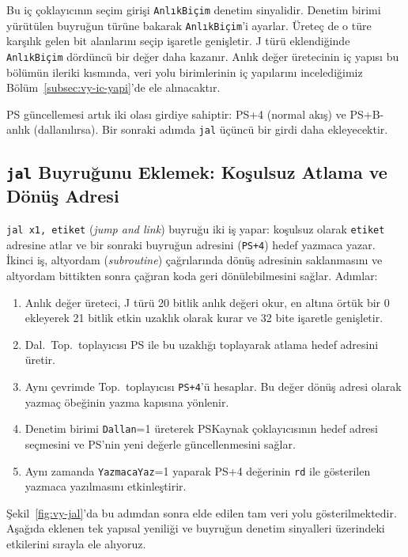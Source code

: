 Bu iç çoklayıcının seçim girişi \texttt{AnlıkBiçim} denetim sinyalidir. Denetim birimi yürütülen buyruğun türüne bakarak \texttt{AnlıkBiçim}'i ayarlar. Üreteç de o türe karşılık gelen bit alanlarını seçip işaretle genişletir. J türü eklendiğinde \texttt{AnlıkBiçim} dördüncü bir değer daha kazanır. Anlık değer üretecinin iç yapısı bu bölümün ileriki kısmında, veri yolu birimlerinin iç yapılarını incelediğimiz Bölüm~\ref{subsec:vy-ic-yapi}'de ele alınacaktır.

PS güncellemesi artık iki olası girdiye sahiptir: PS+4 (normal akış) ve PS+B-anlık (dallanılırsa). Bir sonraki adımda \texttt{jal} üçüncü bir girdi daha ekleyecektir.

\subsection{\texttt{jal} Buyruğunu Eklemek: Koşulsuz Atlama ve Dönüş Adresi}
\label{subsec:vy-jal}

\texttt{jal x1, etiket} (\emph{jump and link}) buyruğu iki iş yapar: koşulsuz olarak \texttt{etiket} adresine atlar ve bir sonraki buyruğun adresini (\texttt{PS+4}) hedef yazmaca yazar. İkinci iş, altyordam (\emph{subroutine}) çağrılarında dönüş adresinin saklanmasını ve altyordam bittikten sonra çağıran koda geri dönülebilmesini sağlar. Adımlar:
\begin{enumerate}
    \item Anlık değer üreteci, J türü 20 bitlik anlık değeri okur, en altına örtük bir 0 ekleyerek 21 bitlik etkin uzaklık olarak kurar ve 32 bite işaretle genişletir.
    \item Dal.\ Top.\ toplayıcısı PS ile bu uzaklığı toplayarak atlama hedef adresini üretir.
    \item Aynı çevrimde Top.\ toplayıcısı \texttt{PS+4}'ü hesaplar. Bu değer dönüş adresi olarak yazmaç öbeğinin yazma kapısına yönlenir.
    \item Denetim birimi \texttt{Dallan}=1 üreterek PSKaynak çoklayıcısının hedef adresi seçmesini ve PS'nin yeni değerle güncellenmesini sağlar.
    \item Aynı zamanda \texttt{YazmacaYaz}=1 yaparak PS+4 değerinin \texttt{rd} ile gösterilen yazmaca yazılmasını etkinleştirir.
\end{enumerate}

Şekil~\ref{fig:vy-jal}'da bu adımdan sonra elde edilen tam veri yolu gösterilmektedir. Aşağıda eklenen tek yapısal yeniliği ve buyruğun denetim sinyalleri üzerindeki etkilerini sırayla ele alıyoruz.

